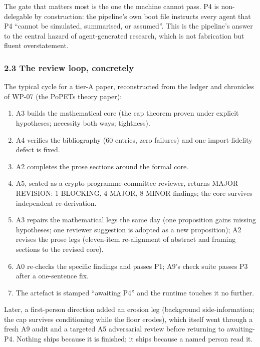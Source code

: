 \documentclass[
  11pt,
]{article}
\providecommand{\tightlist}{%
  \setlength{\itemsep}{0pt}\setlength{\parskip}{0pt}}
\begin{document}
The gate that matters most is the one the machine cannot pass. P4 is
non-delegable by construction: the pipeline's own boot file instructs
every agent that P4 ``cannot be simulated, summarised, or assumed''.
This is the pipeline's answer to the central hazard of agent-generated
research, which is not fabrication but fluent overstatement.

\subsubsection{2.3 The review loop,
concretely}\label{the-review-loop-concretely}

The typical cycle for a tier-A paper, reconstructed from the ledger and
chronicles of WP-07 (the PoPETs theory paper):

\begin{enumerate}
\def\labelenumi{\arabic{enumi}.}
\tightlist
\item
  A3 builds the mathematical core (the cap theorem proven under explicit
  hypotheses; necessity both ways; tightness).
\item
  A4 verifies the bibliography (60 entries, zero failures) and one
  import-fidelity defect is fixed.
\item
  A2 completes the prose sections around the formal core.
\item
  A5, seated as a crypto programme-committee reviewer, returns MAJOR
  REVISION: 1 BLOCKING, 4 MAJOR, 8 MINOR findings; the core survives
  independent re-derivation.
\item
  A3 repairs the mathematical legs the same day (one proposition gains
  missing hypotheses; one reviewer suggestion is adopted as a new
  proposition); A2 revises the prose legs (eleven-item re-alignment of
  abstract and framing sections to the revised core).
\item
  A0 re-checks the specific findings and passes P1; A9's check suite
  passes P3 after a one-sentence fix.
\item
  The artefact is stamped ``awaiting P4'' and the runtime touches it no
  further.
\end{enumerate}

Later, a first-person direction added an erosion leg (background
side-information; the cap survives conditioning while the floor erodes),
which itself went through a fresh A9 audit and a targeted A5 adversarial
review before returning to awaiting-P4. Nothing ships because it is
finished; it ships because a named person read it.
\end{document}
